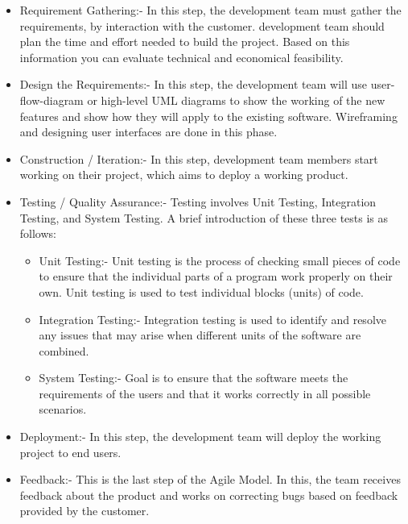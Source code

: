 \begin{itemize}
    \item Requirement Gathering:- In this step, the development team must gather the requirements, by interaction with the customer. development team should plan the time and effort needed to build the project. Based on this information you can evaluate technical and economical feasibility.

    \item Design the Requirements:- In this step, the development team will use user-flow-diagram or high-level UML diagrams to show the working of the new features and show how they will apply to the existing software. Wireframing and designing user interfaces are done in this phase.

    \item Construction / Iteration:- In this step, development team members start working on their project, which aims to deploy a working product.

    \item Testing / Quality Assurance:- Testing involves Unit Testing, Integration Testing, and System Testing. A brief introduction of these three tests is as follows:
    \begin{itemize}
        \item Unit Testing:- Unit testing is the process of checking small pieces of code to ensure that the individual parts of a program work properly on their own. Unit testing is used to test individual blocks (units) of code.
        \item Integration Testing:- Integration testing is used to identify and resolve any issues that may arise when different units of the software are combined.
        \item System Testing:- Goal is to ensure that the software meets the requirements of the users and that it works correctly in all possible scenarios.
    \end{itemize}

    \item Deployment:- In this step, the development team will deploy the working project to end users.

    \item Feedback:- This is the last step of the Agile Model. In this, the team receives feedback about the product and works on correcting bugs based on feedback provided by the customer.
\end{itemize}